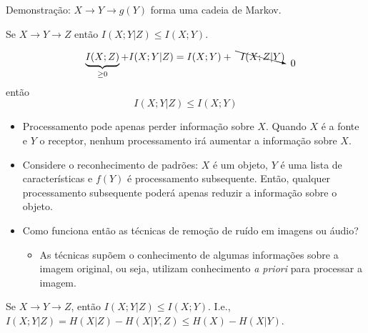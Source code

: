 \begin{frame}[allowframebreaks]
\begin{corollary}
  Demonstração: $X \rightarrow Y \rightarrow g(Y)$ forma uma cadeia de Markov.
  \end{corollary}

  \begin{corollary}
  Se $X \rightarrow Y \rightarrow Z$ então $I(X;Y|Z) \leq I(X;Y)$.

  \begin{equation}
  \underbrace{I(X;Z)}_{\geq 0} + I(X; Y|Z) = I(X;Y) + \bcancelto{0}{I(X;Z|Y)}
  \end{equation}
  então
  \begin{equation}
  I(X; Y|Z) \leq I(X;Y)
  \end{equation}
  \end{corollary}

  \begin{itemize}
  \item Processamento pode apenas perder informação sobre $X$.
        Quando $X$ é a fonte e $Y$ o receptor, nenhum processamento irá aumentar a informação sobre $X$.
  \item Considere o reconhecimento de padrões: $X$ é um objeto, $Y$ é uma lista de características
        e $f(Y)$ é processamento subsequente. Então, qualquer processamento subsequente poderá apenas
        reduzir a informação sobre o objeto.
  \item Como funciona então as técnicas de remoção de ruído em imagens ou áudio?
        \begin{itemize}
        \item  As técnicas supõem o conhecimento de algumas informações sobre a imagem original, ou seja,
          utilizam conhecimento \textit{a priori} para processar a imagem. 
        \end{itemize}
  \end{itemize}
  
  \begin{corollary}
  Se $X \rightarrow Y \rightarrow Z$, então $I(X; Y|Z) \leq I(X;Y)$. I.e.,
  $I(X; Y|Z) = H(X|Z) - H(X|Y,Z) \leq H(X) - H(X|Y)$.
  \end{corollary}
  
\end{frame}



